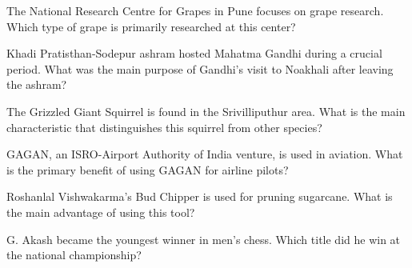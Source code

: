 \documentclass[12pt,a4paper]{book}
\begin{document}
\begin{enhancedmcq}[Question 39]{The National Research Centre for Grapes in Pune focuses on grape research. Which type of grape is primarily researched at this center?}
\end{enhancedmcq}

\begin{enhancedmcq}[Question 40]{Khadi Pratisthan-Sodepur ashram hosted Mahatma Gandhi during a crucial period. What was the main purpose of Gandhi's visit to Noakhali after leaving the ashram?}
\end{enhancedmcq}

\begin{enhancedmcq}[Question 41]{The Grizzled Giant Squirrel is found in the Srivilliputhur area. What is the main characteristic that distinguishes this squirrel from other species?}
\end{enhancedmcq}

\begin{enhancedmcq}[Question 42]{GAGAN, an ISRO-Airport Authority of India venture, is used in aviation. What is the primary benefit of using GAGAN for airline pilots?}
\end{enhancedmcq}

\begin{enhancedmcq}[Question 43]{Roshanlal Vishwakarma's Bud Chipper is used for pruning sugarcane. What is the main advantage of using this tool?}
\end{enhancedmcq}

\begin{enhancedmcq}[Question 44]{G. Akash became the youngest winner in men's chess. Which title did he win at the national championship?}
\end{enhancedmcq}
\end{document}
